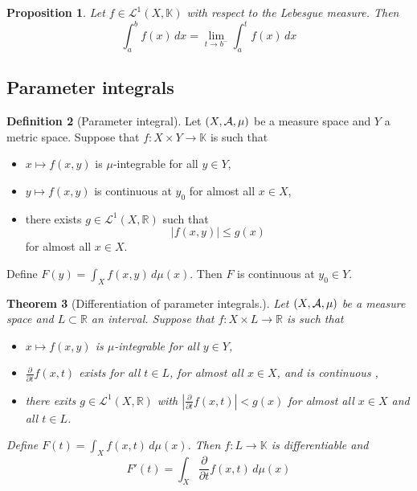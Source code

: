 \documentclass[10pt, oneside, reqno]{amsart}
\theoremstyle{plain}%
\newtheorem{thm}{Theorem}[section]
\newtheorem{prop}[thm]{Proposition}
\theoremstyle{definition}
\newtheorem{defn}[thm]{Definition}
\theoremstyle{remark}
\newcommand{\R}{\mathbb{R}}
\newcommand{\dmu}{\, d \mu}
\begin{document}
\begin{prop}
	Let $f \in 	\mathcal{L}^1(X,\mathbb{K})$ with respect to the Lebesgue measure.  Then \[
		\int_a^b f(x) \, dx = \lim_{t \rightarrow b^-} \int_a^t f(x) \, dx
	\]
\end{prop}

\subsection{Parameter integrals} %
\label{sub:parameter_integrals}
\newcommand{\ellone}[1]{\mathcal{L}^1(X,#1)}
\begin{defn}[Parameter integral]
	Let $(X, \mathcal{A}, \mu)$ be a measure space and $Y$ a metric space.  Suppose that $f : X \times Y \rightarrow \mathbb{K}$ is such that 
	 \begin{itemize}
	 	\item $x \mapsto f(x,y)$ is $\mu$-integrable for all $y \in Y$,
	 	\item $y \mapsto f(x,y)$ is continuous at $y_0$ for almost all $x \in X$,
	 	\item there exists $g \in \ellone{\R}$ such that \[
	 		|f(x,y)| \leq g(x)
	 	\] for almost all $x \in X$.  

	 \end{itemize}
		Define $F(y) = \int_X f(x,y) \dmu(x)$.  Then $F$ is continuous at $y_0 \in Y$.
	
\end{defn}


\begin{thm}[Differentiation of parameter integrals.]
	Let $(X, \mathcal{A}, \mu)$ be a measure space and $L \subset \R$ an interval.  Suppose that $f: X \times L \rightarrow \R$ is such that 
	\begin{itemize}
		\item $x \mapsto f(x,y)$ is $\mu$-integrable for all $y \in Y$,
		\item $\frac{\partial}{\partial t} f(x,t)$ exists for all $t \in L$, for almost all $x \in X$, and is continuous ,
		\item there exits $g \in \ellone{\R}$ with $|\frac{\partial}{\partial t} f(x,t)| < g(x)$ for almost all $x \in X$ and all $t \in L$.   
	 	
	\end{itemize}
	
	Define $F(t) = \int_X f(x,t) \dmu(x)$.  Then $f : L \rightarrow \mathbb{K}$ is differentiable and \[
		F'(t) = \int_X \frac{\partial}{\partial t} f(x,t) \dmu(x)
	\]
\end{thm}
\end{document}
